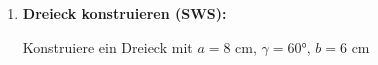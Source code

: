 \begin{enumerate}[label=\arabic*.]
    \vspace{7cm}

    \item \textbf{Dreieck konstruieren (SWS):}

    Konstruiere ein Dreieck mit $a = 8$ cm, $\gamma = 60°$, $b = 6$ cm

    \vspace{6cm}

\end{enumerate}